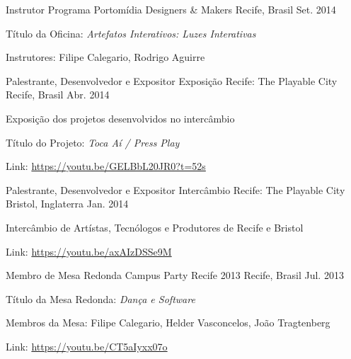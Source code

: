 \begin{cventries}
\cventry
	{Instrutor}
	{Programa Portomídia Designers \& Makers}
	{Recife, Brasil}
	{Set. 2014}
	{\begin{cvitems}
		\item{Título da Oficina: \textit{Artefatos Interativos: Luzes Interativas}}
		\item{Instrutores: Filipe Calegario, Rodrigo Aguirre}
	\end{cvitems}}

\cventry
	{Palestrante, Desenvolvedor e Expositor}
	{Exposição Recife: The Playable City}
	{Recife, Brasil}
	{Abr. 2014}
	{\begin{cvitems}
		\item{Exposição dos projetos desenvolvidos no intercâmbio}
		\item{Título do Projeto: \textit{Toca Aí / Press Play}}
		\item{Link: \href{https://youtu.be/GELBbL20JR0?t=52s}{https://youtu.be/GELBbL20JR0?t=52s}}
	\end{cvitems}}

\cventry
	{Palestrante, Desenvolvedor e Expositor}
	{Intercâmbio Recife: The Playable City}
	{Bristol, Inglaterra}
	{Jan. 2014}
	{\begin{cvitems}
		\item{Intercâmbio de Artístas, Tecnólogos e Produtores de Recife e Bristol}
		\item{Link: \href{https://youtu.be/axAIzDSSe9M}{https://youtu.be/axAIzDSSe9M}}
	\end{cvitems}}

\cventry
	{Membro de Mesa Redonda}
	{Campus Party Recife 2013}
	{Recife, Brasil}
	{Jul. 2013}
	{\begin{cvitems}
		\item{Título da Mesa Redonda: \textit{Dança e Software}}
		\item{Membros da Mesa: Filipe Calegario, Helder Vasconcelos, João Tragtenberg}
		\item{Link: \href{https://youtu.be/CT5aIyxx07o}{https://youtu.be/CT5aIyxx07o}}
	\end{cvitems}}


\end{cventries}
